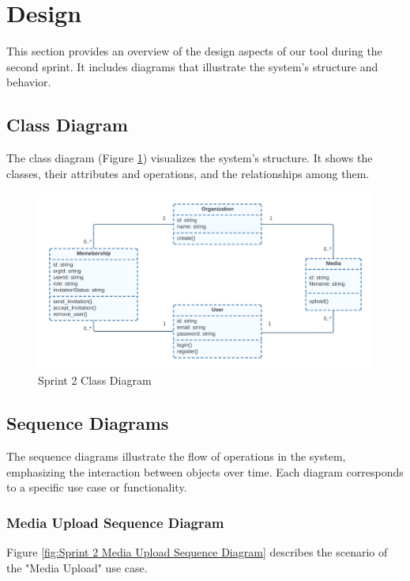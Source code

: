 
\section{Design}
This section provides an overview of the design aspects of our tool during the second sprint. It includes diagrams that illustrate the system's structure and behavior.

\subsection{Class Diagram}

The class diagram (Figure \ref{fig:Sprint 2 Class Diagram}) visualizes the system's structure. It shows the classes, their attributes and operations, and the relationships among them.

\begin{figure}[ht]
	\centering
	\includegraphics[width=\linewidth]{Images/sprint2/class diagram.png}
	\caption{Sprint 2 Class Diagram}
	\label{fig:Sprint 2 Class Diagram}
\end{figure}

\subsection{Sequence Diagrams}

The sequence diagrams illustrate the flow of operations in the system, emphasizing the interaction between objects over time. Each diagram corresponds to a specific use case or functionality.

\subsubsection{Media Upload Sequence Diagram}

Figure \ref{fig:Sprint 2 Media Upload Sequence Diagram} describes the scenario of the "Media Upload" use case.

